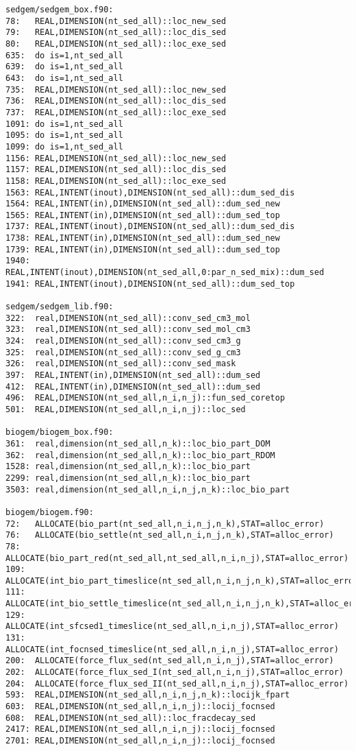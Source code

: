 \documentclass[a4paper,10pt,article]{memoir}
\begin{document}
\begin{small}
\begin{verbatim}
sedgem/sedgem_box.f90:
78:   REAL,DIMENSION(nt_sed_all)::loc_new_sed
79:   REAL,DIMENSION(nt_sed_all)::loc_dis_sed
80:   REAL,DIMENSION(nt_sed_all)::loc_exe_sed
635:  do is=1,nt_sed_all
639:  do is=1,nt_sed_all
643:  do is=1,nt_sed_all
735:  REAL,DIMENSION(nt_sed_all)::loc_new_sed
736:  REAL,DIMENSION(nt_sed_all)::loc_dis_sed
737:  REAL,DIMENSION(nt_sed_all)::loc_exe_sed
1091: do is=1,nt_sed_all
1095: do is=1,nt_sed_all
1099: do is=1,nt_sed_all
1156: REAL,DIMENSION(nt_sed_all)::loc_new_sed
1157: REAL,DIMENSION(nt_sed_all)::loc_dis_sed
1158: REAL,DIMENSION(nt_sed_all)::loc_exe_sed
1563: REAL,INTENT(inout),DIMENSION(nt_sed_all)::dum_sed_dis
1564: REAL,INTENT(in),DIMENSION(nt_sed_all)::dum_sed_new
1565: REAL,INTENT(in),DIMENSION(nt_sed_all)::dum_sed_top
1737: REAL,INTENT(inout),DIMENSION(nt_sed_all)::dum_sed_dis
1738: REAL,INTENT(in),DIMENSION(nt_sed_all)::dum_sed_new
1739: REAL,INTENT(in),DIMENSION(nt_sed_all)::dum_sed_top
1940: REAL,INTENT(inout),DIMENSION(nt_sed_all,0:par_n_sed_mix)::dum_sed
1941: REAL,INTENT(inout),DIMENSION(nt_sed_all)::dum_sed_top

sedgem/sedgem_lib.f90:
322:  real,DIMENSION(nt_sed_all)::conv_sed_cm3_mol
323:  real,DIMENSION(nt_sed_all)::conv_sed_mol_cm3
324:  real,DIMENSION(nt_sed_all)::conv_sed_cm3_g
325:  real,DIMENSION(nt_sed_all)::conv_sed_g_cm3
326:  real,DIMENSION(nt_sed_all)::conv_sed_mask
397:  REAL,INTENT(in),DIMENSION(nt_sed_all)::dum_sed
412:  REAL,INTENT(in),DIMENSION(nt_sed_all)::dum_sed
496:  REAL,DIMENSION(nt_sed_all,n_i,n_j)::fun_sed_coretop
501:  REAL,DIMENSION(nt_sed_all,n_i,n_j)::loc_sed

biogem/biogem_box.f90:
361:  real,dimension(nt_sed_all,n_k)::loc_bio_part_DOM
362:  real,dimension(nt_sed_all,n_k)::loc_bio_part_RDOM
1528: real,dimension(nt_sed_all,n_k)::loc_bio_part
2299: real,dimension(nt_sed_all,n_k)::loc_bio_part
3503: real,dimension(nt_sed_all,n_i,n_j,n_k)::loc_bio_part

biogem/biogem.f90:
72:   ALLOCATE(bio_part(nt_sed_all,n_i,n_j,n_k),STAT=alloc_error)
76:   ALLOCATE(bio_settle(nt_sed_all,n_i,n_j,n_k),STAT=alloc_error)
78:   ALLOCATE(bio_part_red(nt_sed_all,nt_sed_all,n_i,n_j),STAT=alloc_error)
109:  ALLOCATE(int_bio_part_timeslice(nt_sed_all,n_i,n_j,n_k),STAT=alloc_error)
111:  ALLOCATE(int_bio_settle_timeslice(nt_sed_all,n_i,n_j,n_k),STAT=alloc_error)
129:  ALLOCATE(int_sfcsed1_timeslice(nt_sed_all,n_i,n_j),STAT=alloc_error)
131:  ALLOCATE(int_focnsed_timeslice(nt_sed_all,n_i,n_j),STAT=alloc_error)
200:  ALLOCATE(force_flux_sed(nt_sed_all,n_i,n_j),STAT=alloc_error)
202:  ALLOCATE(force_flux_sed_I(nt_sed_all,n_i,n_j),STAT=alloc_error)
204:  ALLOCATE(force_flux_sed_II(nt_sed_all,n_i,n_j),STAT=alloc_error)
593:  REAL,DIMENSION(nt_sed_all,n_i,n_j,n_k)::locijk_fpart
603:  REAL,DIMENSION(nt_sed_all,n_i,n_j)::locij_focnsed
608:  REAL,DIMENSION(nt_sed_all)::loc_fracdecay_sed
2417: REAL,DIMENSION(nt_sed_all,n_i,n_j)::locij_focnsed
2701: REAL,DIMENSION(nt_sed_all,n_i,n_j)::locij_focnsed


\end{verbatim}
\end{small}
\end{document}
